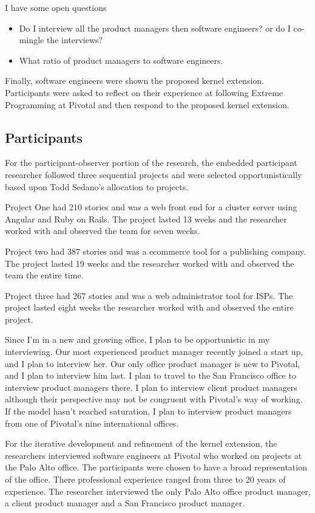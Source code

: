 \documentclass[preprint,12pt,3p]{elsarticle}
\begin{document}
{I have some open questions
\begin{itemize}
\item Do I interview all the product managers then software engineers? or do I co-mingle the interviews?
\item What ratio of product managers to software engineers.
\end{itemize}

Finally, software engineers were shown the proposed kernel extension. Participants were asked to reflect on their experience at following Extreme Programming at Pivotal and then respond to the proposed kernel extension.

\subsection{Participants}
For the participant-observer portion of the research, the embedded participant researcher followed three sequential projects and were selected opportunistically based upon Todd Sedano's allocation to projects. 

Project One had 210 stories and was a web front end for a cluster server using Angular and Ruby on Rails. The project lasted 13 weeks and the researcher worked with and observed the team for seven weeks. 

Project two had 387 stories and was a ecommerce tool for a publishing company. The project lasted 19 weeks and the researcher worked with and observed the team the entire time.

Project three had 267 stories and was a web administrator tool for ISPs. The project lasted eight weeks the researcher worked with and observed the entire project.

Since I'm in a new and growing office, I plan to be opportunistic in my interviewing. Our most experienced product manager recently joined a start up, and I plan to interview her. Our only office product manager is new to Pivotal, and I plan to interview him last. I plan to travel to the San Francisco office to interview product managers there. I plan to interview client product managers although their perspective may not be congruent with Pivotal's way of working. If the model hasn't reached saturation, I plan to interview product managers from one of Pivotal's nine international offices.


For the iterative development and refinement of the kernel extension, the researchers interviewed software engineers at Pivotal who worked on projects at the Palo Alto office. The participants were chosen to have a broad representation of the office. There professional experience ranged from three to 20 years of experience. The researcher interviewed the only Palo Alto office product manager, a client product manager and a San Francisco product manager. 

}
\end{document}
